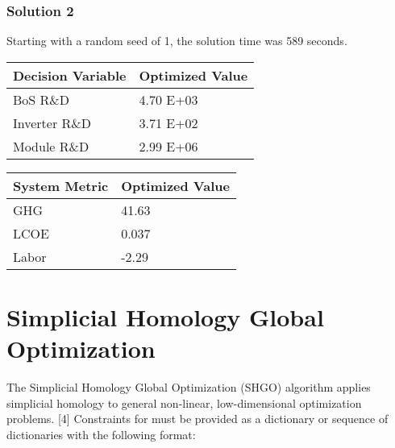 \documentclass[letterpaper,10pt,english]{sphinxmanual}
\begin{document}
\subsubsection{Solution 2}
\label{\detokenize{optimizers:solution-2}}
Starting with a random seed of 1, the solution time was 589 seconds.


\begin{savenotes}\sphinxattablestart
\centering
{}
\sphinxthecaptionisattop
{}\label{\detokenize{optimizers:table-6}}\label{\detokenize{optimizers:tbl-diffevvars2}}
\sphinxaftertopcaption
\begin{tabulary}{\linewidth}[t]{|T|T|}
\hline
\sphinxstyletheadfamily 
Decision Variable
&\sphinxstyletheadfamily 
Optimized Value
\\
\hline
BoS R\&D
&
4.70 E+03
\\
\hline
Inverter R\&D
&
3.71 E+02
\\
\hline
Module R\&D
&
2.99 E+06
\\
\hline
\end{tabulary}
\par
\sphinxattableend\end{savenotes}


\begin{savenotes}\sphinxattablestart
\centering
{}
\sphinxthecaptionisattop
{}\label{\detokenize{optimizers:table-7}}\label{\detokenize{optimizers:tbl-diffevmetrics2}}
\sphinxaftertopcaption
\begin{tabulary}{\linewidth}[t]{|T|T|}
\hline
\sphinxstyletheadfamily 
System Metric
&\sphinxstyletheadfamily 
Optimized Value
\\
\hline
GHG
&
41.63
\\
\hline
LCOE
&
0.037
\\
\hline
Labor
&
-2.29
\\
\hline
\end{tabulary}
\par
\sphinxattableend\end{savenotes}


\section{Simplicial Homology Global Optimization}
\label{\detokenize{optimizers:simplicial-homology-global-optimization}}
The Simplicial Homology Global Optimization (SHGO) algorithm applies simplicial homology to general non-linear, low-dimensional optimization problems. {[}4{]} Constraints for  must be provided as a dictionary or sequence of
dictionaries with the following format:
\end{document}
